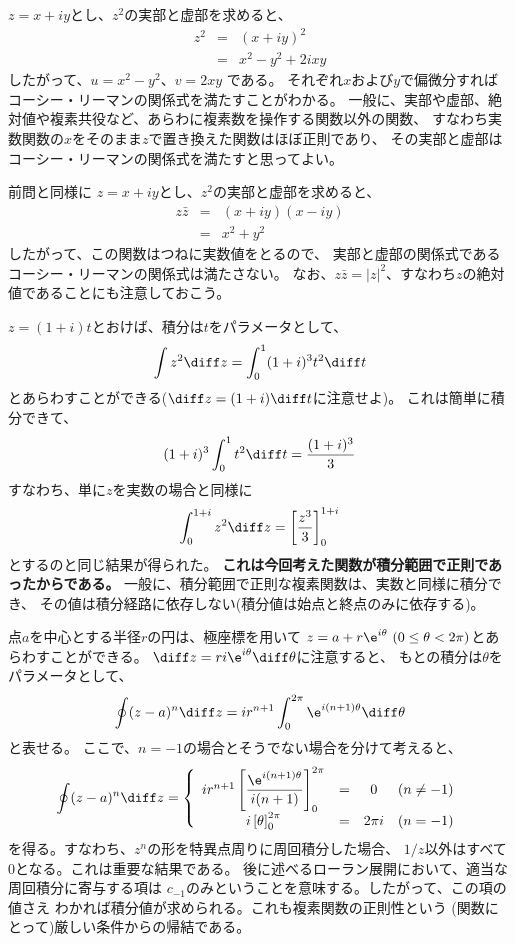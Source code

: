 
$z = x+ iy$とし、$z^2$の実部と虚部を求めると、
\begin{eqnarray}
  z^2 &=& (x+iy)^2\\
  &=& x^2 - y^2 +  2ixy
\end{eqnarray}
したがって、$u = x^2 - y^2$、$v = 2xy$
である。
それぞれ$x$および$y$で偏微分すればコーシー・リーマンの関係式を満たすことがわかる。
一般に、実部や虚部、絶対値や複素共役など、あらわに複素数を操作する関数以外の関数、
すなわち実数関数の$x$をそのまま$z$で置き換えた関数はほぼ正則であり、
その実部と虚部はコーシー・リーマンの関係式を満たすと思ってよい。

前問と同様に
$z = x+ iy$とし、$z^2$の実部と虚部を求めると、
\begin{eqnarray}
  z\bar{z} &=& (x+iy)(x-iy)\\
  &=& x^2 + y^2
\end{eqnarray}
したがって、この関数はつねに実数値をとるので、
実部と虚部の関係式であるコーシー・リーマンの関係式は満たさない。
なお、$z \bar{z} = |z|^2$、すなわち$z$の絶対値であることにも注意しておこう。


$z = (1+i)t$とおけば、積分は$t$をパラメータとして、
$$
  \int z^2 \diff z = \int_0^1 (1+i)^3 t^2  \diff t
$$
とあらわすことができる($\diff z = (1+i) \diff t$に注意せよ)。
これは簡単に積分できて、
$$
  (1+i)^3 \int_0^1 t^2  \diff t = \frac{(1+i)^3}{3}
$$
すなわち、単に$z$を実数の場合と同様に
$$
  \int_0^{1+i} z^2 \diff z = \left[ \frac{z^3}{3}  \right]_0^{1+i}
$$
とするのと同じ結果が得られた。
{\bf これは今回考えた関数が積分範囲で正則であったからである。}
一般に、積分範囲で正則な複素関数は、実数と同様に積分でき、
その値は積分経路に依存しない(積分値は始点と終点のみに依存する)。

点$a$を中心とする半径$r$の円は、極座標を用いて
$z = a + r\e^{i\theta} ~(0 \le \theta < 2\pi)$とあらわすことができる。
$\diff z = ri \e^{i\theta} \diff \theta$に注意すると、
もとの積分は$\theta$をパラメータとして、
\begin{equation}
  \oint (z-a)^n \diff z = i r^{n+1} \int_0^{2\pi} \e^{i(n+1)\theta} \diff \theta
\end{equation}
と表せる。
ここで、$n = -1$の場合とそうでない場合を分けて考えると、
\begin{equation}
  \oint (z-a)^n \diff z =
  \left\{
  \begin{array}{cccc}
    i r^{n+1} \left[ \displaystyle\frac{\e^{i(n+1)\theta}}{i(n+1)} \right]_0^{2\pi} & = & 0      & (n \neq -1) \\
    i \left[ \theta  \right]_0^{2\pi}                                               & = & 2\pi i & (n=-1)
  \end{array}
  \right.
\end{equation}
を得る。すなわち、$z^n$の形を特異点周りに周回積分した場合、
$1/z$以外はすべて$0$となる。これは重要な結果である。
後に述べるローラン展開において、適当な周回積分に寄与する項は
$c_{-1}$のみということを意味する。したがって、この項の値さえ
わかれば積分値が求められる。これも複素関数の正則性という
(関数にとって)厳しい条件からの帰結である。

